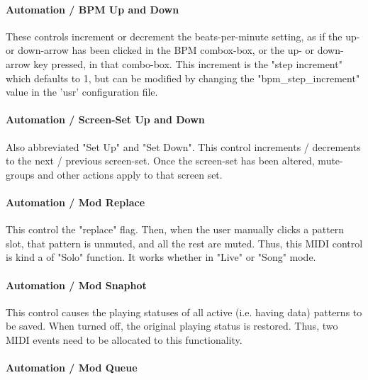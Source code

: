\paragraph{Automation / BPM Up and Down}
\label{paragraph:configuration_midi_ctrl_bpmupdn}

   These controls increment or decrement the beats-per-minute setting, as if
   the up- or down-arrow has been clicked in the BPM combox-box, or the up- or
   down-arrow key pressed, in that combo-box.
   This increment is the
   "step increment" which defaults to 1, but can be modified by
   changing the "bpm\_step\_increment" value in the 'usr'
   configuration file.

\paragraph{Automation / Screen-Set Up and Down}
\label{paragraph:configuration_midi_ctrl_ssupdn}

   Also abbreviated "Set Up" and "Set Down".
   This control increments / decrements to the next / previous screen-set. 
   Once the screen-set has been altered, mute-groups and other
   actions apply to that screen set.

\paragraph{Automation / Mod Replace}
\label{paragraph:configuration_midi_ctrl_modrep}

   This control the "replace" flag.
   Then, when the user manually clicks a pattern slot,
   that pattern is unmuted, and all the rest are muted.
   Thus, this MIDI control is kind a of "Solo" function.
   It works whether in "Live" or "Song" mode.

\paragraph{Automation / Mod Snaphot}
\label{paragraph:configuration_midi_ctrl_modsnap}

   This control causes the playing statuses of all active
   (i.e. having data) patterns to be saved.  When turned off, the
   original playing status is restored.  Thus, two MIDI events
   need to be allocated to this functionality.

\paragraph{Automation / Mod Queue}
\label{paragraph:configuration_midi_ctrl_modqueue}

